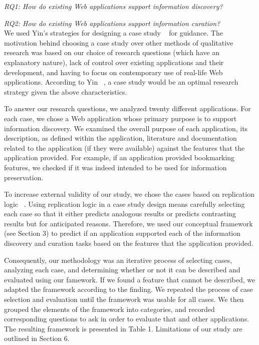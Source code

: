 \documentclass{casconpaper}
\begin{document}
{{\emph{RQ1: How do existing Web applications support information discovery?}

\emph{RQ2: How do existing Web applications support information curation?}\\


We used Yin’s strategies for designing a case study ~\cite{yin} for guidance. The motivation behind choosing a case study over other methods of qualitative research was based on our choice of research questions (which have an explanatory nature), lack of control over existing applications and their development, and having to focus on contemporary use of real-life Web applications. According to Yin ~\cite{yin}, a case study would be an optimal research strategy given the above characteristics.

To answer our research questions, we analyzed twenty different applications. For each case, we chose a Web application whose primary purpose is to support information discovery. We examined the overall purpose of each application, its description, as defined within the application, literature and documentation related to the application (if they were available) against the features that the application provided. For example, if an application provided bookmarking features, we checked if it was indeed intended to be used for information preservation. 

To increase external validity of our study, we chose the cases based on replication logic ~\cite{yin}. Using replication logic in a case study design means carefully selecting each case so that it either predicts analogous results or predicts contrasting results but for anticipated reasons. Therefore, we used our conceptual framework (see Section 3) to predict if an application supported each of the information discovery and curation tasks based on the features that the application provided. 

Consequently, our methodology was an iterative process of selecting cases, analyzing each case, and determining whether or not it can be described and evaluated using our famework. If we found a feature that cannot be described, we adapted the framework according to the finding. We repeated the process of case selection and evaluation until the framework was usable for all cases. We then grouped the elements of the framework into categories, and recorded corresponding questions to ask in order to evaluate that and other applications. The resulting framework is presented in Table 1. Limitations of our study are outlined in Section 6.
} %


}
\end{document}
